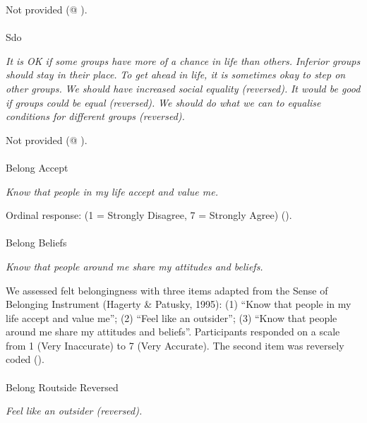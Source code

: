 \documentclass[
  single column]{article}
\makeatletter
\let\oldparagraph\paragraph
\renewcommand{\paragraph}{
    \@ifstar
      \xxxParagraphStar
      \xxxParagraphNoStar
  }
\newcommand{\xxxParagraphStar}[1]{\oldparagraph*{#1}\mbox{}}
\newcommand{\xxxParagraphNoStar}[1]{\oldparagraph{#1}\mbox{}}
\makeatother
\begin{document}
Not provided (@ ).

\paragraph{Sdo}\label{sdo}

\emph{It is OK if some groups have more of a chance in life than
others.} \emph{Inferior groups should stay in their place.} \emph{To get
ahead in life, it is sometimes okay to step on other groups.} \emph{We
should have increased social equality (reversed).} \emph{It would be
good if groups could be equal (reversed).} \emph{We should do what we
can to equalise conditions for different groups (reversed).}

Not provided (@ ).

\paragraph{Belong Accept}\label{belong-accept}

\emph{Know that people in my life accept and value me.}

Ordinal response: (1 = Strongly Disagree, 7 = Strongly Agree)
().

\paragraph{Belong Beliefs}\label{belong-beliefs}

\emph{Know that people around me share my attitudes and beliefs.}

We assessed felt belongingness with three items adapted from the Sense
of Belonging Instrument (Hagerty \& Patusky, 1995): (1) ``Know that
people in my life accept and value me''; (2) ``Feel like an outsider'';
(3) ``Know that people around me share my attitudes and beliefs''.
Participants responded on a scale from 1 (Very Inaccurate) to 7 (Very
Accurate). The second item was reversely coded
().

\paragraph{Belong Routside Reversed}\label{belong-routside-reversed}

\emph{Feel like an outsider (reversed).}
\end{document}
